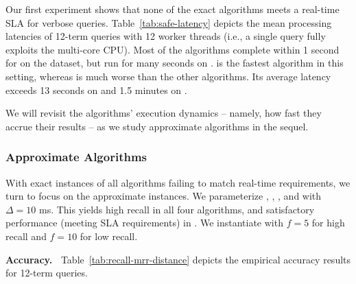 Our first experiment shows that none of the exact algorithms meets a real-time SLA for  verbose queries. 
Table~\ref{tab:safe-latency} depicts the mean processing latencies of 12-term queries with 12 worker 
threads (i.e., a single query fully exploits the multi-core CPU). Most of the algorithms complete within 
1 second for on the {\cw} dataset, but run for many seconds on \cwten. 
{\pRA} is the fastest algorithm in this setting, whereas
\pNRA\/ is much worse than the other algorithms. Its average latency exceeds 
13 seconds on \cw\/ and 1.5 minutes on \cwten.

We will revisit the algorithms' execution dynamics -- namely, how fast they accrue their results -- 
as we study approximate algorithms in the sequel. 
 
\subsubsection{Approximate Algorithms}
 
With  exact instances of all  algorithms failing to match  real-time requirements, we turn to focus on the approximate instances. 
We parameterize \alg, \pRA, \pNRA, and \sNRA\/ with $\Delta=10$ ms. 
This yields high recall in all four algorithms,  and satisfactory performance (meeting SLA requirements) in \alg. 
We instantiate \pBMW\/ with $f=5$ for high recall and $f=10$ for low recall.  

{\bf Accuracy.\ } Table~\ref{tab:recall-mrr-distance} depicts the empirical accuracy results for 12-term queries. 

  
